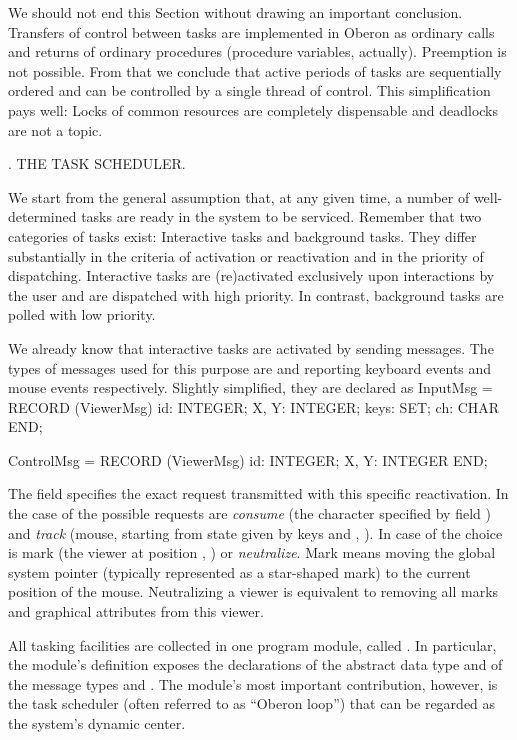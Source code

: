 We should not end this Section without drawing an important
conclusion. Transfers of control between tasks are implemented in
Oberon as ordinary calls and returns of ordinary procedures (procedure
variables, actually). Preemption is not possible. From that we
conclude that active periods of tasks are sequentially ordered and can
be controlled by a single thread of control. This simplification pays
well: Locks of common resources are completely dispensable and
deadlocks are not a topic.

. THE TASK SCHEDULER.

We start from the general assumption that, at any given time, a number
of well-determined tasks are ready in the system to be
serviced. Remember that two categories of tasks exist: Interactive
tasks and background tasks. They differ substantially in the criteria
of activation or reactivation and in the priority of
dispatching. Interactive tasks are (re)activated exclusively upon
interactions by the user and are dispatched with high priority. In
contrast, background tasks are polled with low priority.

We already know that interactive tasks are activated by sending messages. The types of messages used for this purpose are  and  reporting keyboard events and mouse events respectively. Slightly simplified, they are declared as
\begintt
InputMsg = RECORD (ViewerMsg)
  id: INTEGER;
  X, Y: INTEGER;
  keys: SET;
  ch: CHAR
END;

ControlMsg = RECORD (ViewerMsg)
  id: INTEGER;
  X, Y: INTEGER
END;
\endtt

\noindent The field  specifies the exact request transmitted with this
specific reactivation. In the case of  the possible
requests are \emph{consume} (the character specified by field ) and \emph{track} (mouse, starting from state given by keys and , ). In case of  the choice is mark (the viewer
at position , ) or \emph{neutralize}. Mark means moving the
global system pointer (typically represented as a star-shaped mark) to
the current position of the mouse. Neutralizing a viewer is equivalent
to removing all marks and graphical attributes from this viewer.

All tasking facilities are collected in one program module, called
. In particular, the module's definition exposes the
declarations of the abstract data type  and of the message types
 and . The module's most important contribution,
however, is the task scheduler (often referred to as ``Oberon loop'')
that can be regarded as the system's dynamic center.

